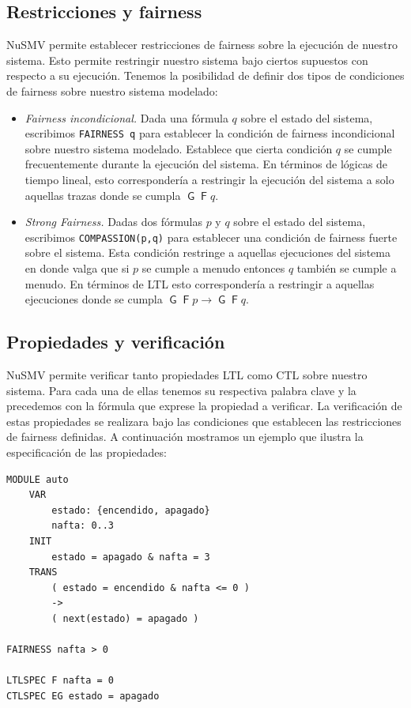 \documentclass[pdftex,a4paper,12pt]{book}
\newcommand{\G}{\mathop{\mathsf{G}}}
\newcommand{\F}{\mathop{\mathsf{F}}}
\begin{document}
\subsection*{Restricciones y fairness}

NuSMV permite establecer restricciones de fairness sobre la ejecuci\'on de nuestro sistema. Esto permite restringir nuestro sistema bajo ciertos supuestos con respecto a su ejecuci\'on. Tenemos la posibilidad de definir dos tipos de condiciones de fairness sobre nuestro sistema modelado:
\begin{itemize}

\item \textit{Fairness incondicional.} Dada una f\'ormula $q$ sobre el estado del sistema, escribimos \texttt{FAIRNESS q} para establecer la condici\'on de fairness incondicional sobre nuestro sistema modelado. Establece que cierta condici\'on $q$ se cumple frecuentemente durante la ejecuci\'on del sistema. En t\'erminos de l\'ogicas de tiempo lineal, esto corresponder\'ia a restringir la ejecuci\'on del sistema a solo aquellas trazas donde se cumpla $\G \F q$.

\item \textit{Strong Fairness.} Dadas dos f\'ormulas $p$ y $q$ sobre el estado del sistema, escribimos \texttt{COMPASSION(p,q)} para establecer una condici\'on de fairness fuerte sobre el sistema. Esta condici\'on restringe a aquellas ejecuciones del sistema en donde valga que si $p$ se cumple a menudo entonces $q$ tambi\'en se cumple a menudo. En t\'erminos de LTL esto corresponder\'ia a restringir a aquellas ejecuciones donde se cumpla $\G \F p \rightarrow \G \F q$.

\end{itemize}

\subsection*{Propiedades y verificaci\'on}

NuSMV permite verificar tanto propiedades LTL como CTL sobre nuestro sistema. Para cada una de ellas tenemos su respectiva palabra clave y la precedemos con la f\'ormula que exprese la propiedad a verificar. La verificaci\'on de estas propiedades se realizara bajo las condiciones que establecen las restricciones de fairness definidas. A continuaci\'on mostramos un ejemplo que ilustra la especificaci\'on de las propiedades:

\begin{verbatim}
MODULE auto
    VAR
        estado: {encendido, apagado}
        nafta: 0..3
    INIT
        estado = apagado & nafta = 3
    TRANS
        ( estado = encendido & nafta <= 0 ) 
        -> 
        ( next(estado) = apagado )

FAIRNESS nafta > 0

LTLSPEC F nafta = 0
CTLSPEC EG estado = apagado
\end{verbatim}
\end{document}
